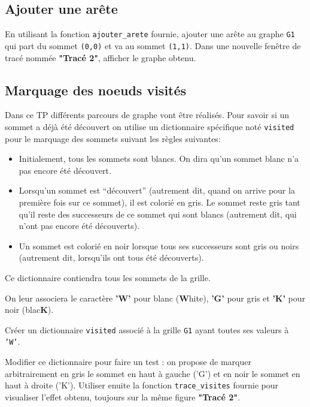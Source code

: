 \subsection*{Ajouter une arête}

\begin{question}
En utilisant la fonction \texttt{ajouter\_arete} fournie, ajouter une arête au graphe \texttt{G1} qui part du sommet \texttt{(0,0)} et va au sommet \texttt{(1,1)}. Dans une nouvelle fenêtre de tracé nommée \textbf{"Tracé 2"}, afficher le graphe obtenu.


\end{question}


\subsection*{Marquage des noeuds visités}
Dans ce TP différents parcours de graphe vont être réalisés. Pour savoir si un sommet a déjà été découvert on utilise un dictionnaire spécifique  noté \texttt{visited} pour le marquage des sommets suivant les règles suivantes:  

\begin{itemize}
\item
 Initialement, tous les sommets sont blancs. On dira qu’un sommet blanc n’a pas encore été
découvert.
\item Lorsqu’un sommet est “découvert” (autrement dit, quand on arrive pour la première fois sur
ce sommet), il est colorié en gris. Le sommet reste gris tant qu’il reste des successeurs de ce
sommet qui sont blancs (autrement dit, qui n’ont pas encore été découverts).
\item Un sommet est colorié en noir lorsque tous ses successeurs sont gris ou noirs (autrement dit,
lorsqu’ils ont tous été découverts).

\end{itemize}


Ce dictionnaire contiendra tous les sommets de la grille.

On leur associera le caractère \textbf{'W'} pour blanc (\textbf{W}hite), \textbf{'G'} pour gris et \textbf{'K'} pour noir (blac\textbf{K}).


\begin{question}
Créer un dictionnaire \texttt{visited} associé à la grille  \texttt{G1} ayant toutes ses valeurs à \texttt{'W'}.
\end{question}

\begin{question}
Modifier ce dictionnaire pour faire un test : on propose de marquer arbitrairement en gris le sommet en haut à gauche ('G') et en noir le sommet en haut à droite ('K'). Utiliser enuite la fonction \texttt{trace\_visites} fournie pour visualiser l'effet obtenu, toujours sur la même figure \textbf{"Tracé 2"}. 
\end{question}

